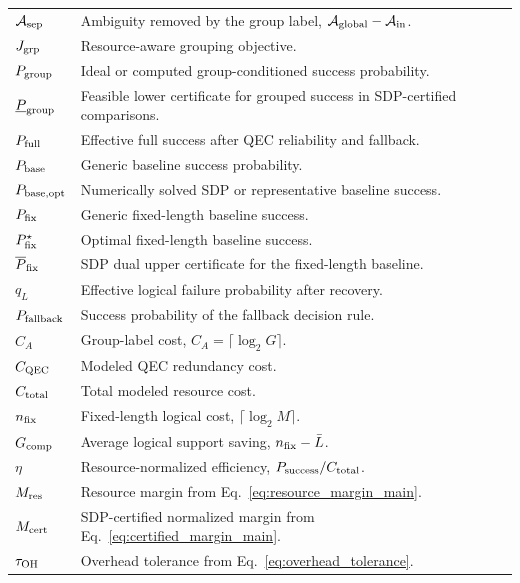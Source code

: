 \documentclass[
 reprint,
 amsmath,amssymb,
 aps,
 pra,
 floatfix,
]{revtex4-2}
\begin{document}
\begin{table}[t]
\begin{ruledtabular}
\begin{tabular}{llll}
\(\mathcal A_{\rm sep}\) & Ambiguity removed by the group label, \(\mathcal A_{\rm global}-\mathcal A_{\rm in}\).\\
\(J_{\rm grp}\) & Resource-aware grouping objective.\\
\(P_{\rm group}\) & Ideal or computed group-conditioned success probability.\\
\(\underline P_{\rm group}\) & Feasible lower certificate for grouped success in SDP-certified comparisons.\\
\(P_{\rm full}\) & Effective full success after QEC reliability and fallback.\\
\(P_{\rm base}\) & Generic baseline success probability.\\
\(P_{\rm base,opt}\) & Numerically solved SDP or representative baseline success.\\
\(P_{\rm fix}\) & Generic fixed-length baseline success.\\
\(P^\star_{\rm fix}\) & Optimal fixed-length baseline success.\\
\(\overline P_{\rm fix}\) & SDP dual upper certificate for the fixed-length baseline.\\
\(q_L\) & Effective logical failure probability after recovery.\\
\(P_{\rm fallback}\) & Success probability of the fallback decision rule.\\
\(C_A\) & Group-label cost, \(C_A=\lceil \log_2 G\rceil\).\\
\(C_{\rm QEC}\) & Modeled QEC redundancy cost.\\
\(C_{\rm total}\) & Total modeled resource cost.\\
\(n_{\rm fix}\) & Fixed-length logical cost, \(\lceil\log_2M\rceil\).\\
\(G_{\rm comp}\) & Average logical support saving, \(n_{\rm fix}-\bar L\).\\
\(\eta\) & Resource-normalized efficiency, \(P_{\rm success}/C_{\rm total}\).\\
\(M_{\rm res}\) & Resource margin from Eq.~\eqref{eq:resource_margin_main}.\\
\(M_{\rm cert}\) & SDP-certified normalized margin from Eq.~\eqref{eq:certified_margin_main}.\\
\(\tau_{\rm OH}\) & Overhead tolerance from Eq.~\eqref{eq:overhead_tolerance}.\\
\end{tabular}
\end{ruledtabular}
\end{table}
\end{document}
